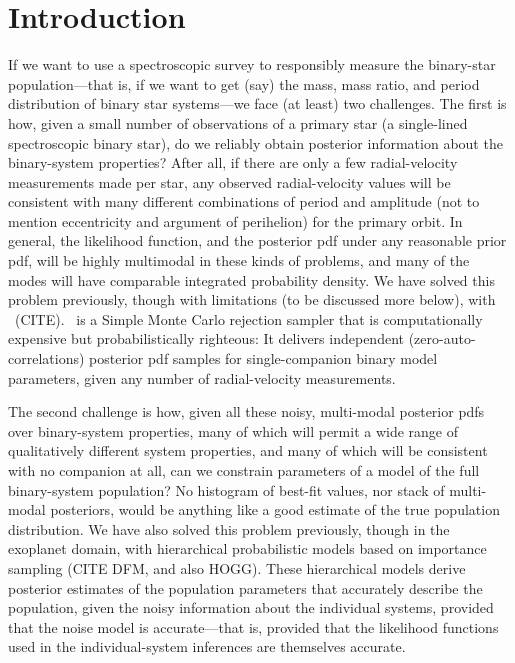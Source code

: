 \documentclass[modern, letterpaper]{aastex61}
\newcommand{\thejoker}{\project{The~Joker}}
\begin{document}

\section{Introduction} \label{sec:intro}

If we want to use a spectroscopic survey to responsibly measure the
binary-star population---that is, if we want to get (say) the mass,
mass ratio, and period distribution of binary star systems---we face
(at least) two challenges.
The first is how, given a small number of observations of a primary
star (a single-lined spectroscopic binary star), do we reliably obtain posterior
information about the binary-system properties?
After all, if there are only a few radial-velocity measurements made
per star, any observed radial-velocity values will be consistent with
many different combinations of period and amplitude (not to mention
eccentricity and argument of perihelion) for the primary orbit.
In general, the likelihood function, and the posterior pdf under any
reasonable prior pdf, will be highly multimodal in these kinds of
problems, and many of the modes will have comparable integrated
probability density.
We have solved this problem previously, though with limitations (to be
discussed more below), with \thejoker\ (CITE).
\thejoker\ is a Simple Monte Carlo rejection sampler that is
computationally expensive but probabilistically righteous: It delivers
independent (zero-auto-correlations) posterior pdf samples for
single-companion binary model parameters, given any number of
radial-velocity measurements.

The second challenge is how, given all these noisy, multi-modal
posterior pdfs over binary-system properties, many of which will
permit a wide range of qualitatively different system properties, and
many of which will be consistent with no companion at all, can we
constrain parameters of a model of the full binary-system population?
No histogram of best-fit values, nor stack of multi-modal posteriors,
would be anything like a good estimate of the true population
distribution.
We have also solved this problem previously, though in the exoplanet
domain, with hierarchical probabilistic models based on importance
sampling (CITE DFM, and also HOGG).
These hierarchical models derive posterior estimates of the population
parameters that accurately describe the population, given the noisy
information about the individual systems, provided that the noise
model is accurate---that is, provided that the likelihood functions
used in the individual-system inferences are themselves accurate.
\end{document}
